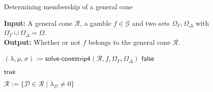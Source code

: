 \documentclass{article}
\theoremstyle{mytheorem}
\newtheorem{definition}[theorem]{Definition}
\newcommand{\func}[1]{\ensuremath{\textsf{#1}}} %
\newcommand{\set}[1]{\ensuremath{\{ #1 \} }} %
\begin{document}
\begin{algorithm}[h]
\caption{Determining membership of a general cone}
{\textbf{Input:}} A general cone $\mathcal{R}$, a gamble $f \in \mathcal{G}$ and two sets $\Omega_\Gamma, \Omega_\Delta$ with $\Omega_\Gamma \cup \Omega_\Delta = \Omega$. \\
{\textbf{Output:} Whether or not $f$ belongs to the general cone $\mathcal{R}$. }
\label{alg:conestrip}
\begin{algorithmic}[1]
\While { \func{true} }
  \State $(\lambda, \mu, \sigma) := \func{solve-conestrip4}(\mathcal{R}, f, \Omega_\Gamma, \Omega_\Delta)$
  \If { $(\lambda, \mu, \sigma) = (\bot,\bot,\bot)$ }
    \State \Return \func{false}
  \EndIf

    \State \Return \func{true}
  \EndIf

  \State $\mathcal{R} := \set{\mathcal{D} \in \mathcal{R} \mid \lambda_\mathcal{D} \neq 0}$

\EndWhile
\EndFunction
\end{algorithmic}
\end{algorithm}

\end{document}
